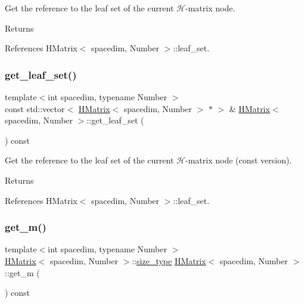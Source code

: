 Get the reference to the leaf set of the current $\mathcal{H}$-\/matrix node. \begin{DoxyReturn}{Returns}

\end{DoxyReturn}


References H\+Matrix$<$ spacedim, Number $>$\+::leaf\+\_\+set.

\mbox{\label{classHMatrix_a851d7bb3632bc1d18538d4d1dd5f6393}} 
\subsubsection{\texorpdfstring{get\+\_\+leaf\+\_\+set()}{get\_leaf\_set()}\hspace{0.1cm}{\footnotesize\ttfamily [2/2]}}
{\footnotesize\ttfamily template$<$int spacedim, typename Number $>$ \\
const std\+::vector$<$ \hyperlink{classHMatrix}{H\+Matrix}$<$ spacedim, Number $>$ $\ast$ $>$ \& \hyperlink{classHMatrix}{H\+Matrix}$<$ spacedim, Number $>$\+::get\+\_\+leaf\+\_\+set (\begin{DoxyParamCaption}{ }\end{DoxyParamCaption}) const}

Get the reference to the leaf set of the current $\mathcal{H}$-\/matrix node (const version). \begin{DoxyReturn}{Returns}

\end{DoxyReturn}


References H\+Matrix$<$ spacedim, Number $>$\+::leaf\+\_\+set.

\mbox{\label{classHMatrix_aabe735f7712a10ba5325ff116f8ca1c7}} 
\subsubsection{\texorpdfstring{get\+\_\+m()}{get\_m()}}
{\footnotesize\ttfamily template$<$int spacedim, typename Number $>$ \\
\hyperlink{classHMatrix}{H\+Matrix}$<$ spacedim, Number $>$\+::\hyperlink{classHMatrix_a5ca8dc549783d38371a01ecd621ecb34}{size\+\_\+type} \hyperlink{classHMatrix}{H\+Matrix}$<$ spacedim, Number $>$\+::get\+\_\+m (\begin{DoxyParamCaption}{ }\end{DoxyParamCaption}) const}

